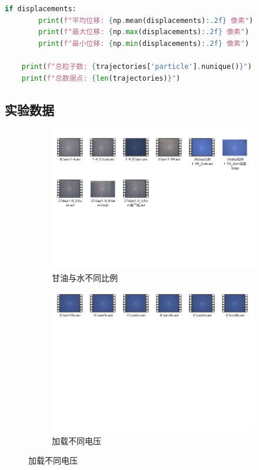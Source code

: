 \documentclass[a4paper]{report} %
\begin{document}
\begin{lstlisting}[language=Python, caption=可视化与计算, label=code:calculate]
    if displacements:
        print(f"平均位移: {np.mean(displacements):.2f} 像素")
        print(f"最大位移: {np.max(displacements):.2f} 像素")
        print(f"最小位移: {np.min(displacements):.2f} 像素")
    
    print(f"总粒子数: {trajectories['particle'].nunique()}")
    print(f"总数据点: {len(trajectories)}")
\end{lstlisting}

\subsection{实验数据}
\begin{figure}[H]
    \centering
    \begin{subfigure}{0.45\textwidth}
        \includegraphics[width=\linewidth]{不同比例.png}
        \caption{甘油与水不同比例}
    \end{subfigure}
    \begin{subfigure}{0.45\textwidth}
        \includegraphics[width=\linewidth]{不同电压.png}
        \caption{加载不同电压}
    \end{subfigure}


\end{figure}
\end{document}
